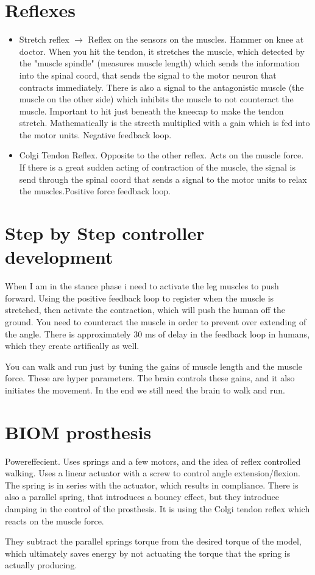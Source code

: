 \documentclass[a4paper]{article}
\begin{document}
\section{Reflexes}
\begin{itemize}
	\item Stretch reflex $ \rightarrow $ Reflex on the sensors on the muscles. Hammer on knee at doctor. When you hit the tendon, it stretches the muscle, which detected by the "muscle spindle" (measures muscle length) which sends the information into the spinal coord, that sends the signal to the motor neuron that contracts immediately.  There is also a signal to the antagonistic muscle (the muscle on the other side) which inhibits the muscle to not counteract the muscle. Important to hit just beneath the kneecap to make the tendon stretch. Mathematically is the strecth multiplied with a gain which is fed into the motor units. Negative feedback loop.  
	\item Colgi Tendon Reflex. Opposite to the other reflex. Acts on the muscle force. If there is a great sudden acting of contraction of the muscle, the signal is send through the spinal coord that sends a signal to the motor units to relax the muscles.Positive force feedback loop.
\end{itemize}

\section{Step by Step controller development}
When I am in the stance phase i need to activate the leg muscles to push forward. Using the positive feedback loop to register when the muscle is stretched, then activate the contraction, which will push the human off the ground. You need to counteract the muscle in order to prevent over extending of the angle. There is approximately 30 ms of delay in the feedback loop in humans, which they create artifically as well.



You can walk and run just by tuning the gains of muscle length and the muscle force. These are hyper parameters. The brain controls these gains, and it also initiates the movement. In the end we still need the brain to walk and run.

\section{BIOM prosthesis}
Powereffecient. Uses springs and a few motors, and the idea of reflex controlled walking. Uses a linear actuator with a screw to control angle extension/flexion. The spring is in series with the actuator, which results in compliance. There is also a parallel spring, that introduces a bouncy effect, but they introduce damping in the control of the prosthesis. It is using the Colgi tendon reflex which reacts on the muscle force. 

They subtract the parallel springs torque from the desired torque of the model, which ultimately saves energy by not actuating the torque that the spring is actually producing.
\end{document}
